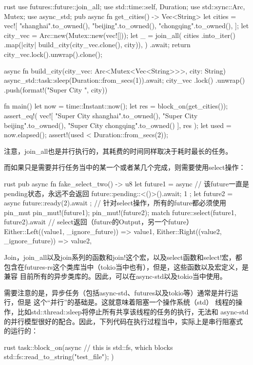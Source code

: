 \begin{code-block}{rust}
use futures::future::join_all;
use std::time::{self, Duration};
use std::sync::{Arc, Mutex};
use async_std;
pub async fn get_cities() -> Vec<String> {
    let cities = vec![
        "shanghai".to_owned(),
        "beijing".to_owned(),
        "chongqing".to_owned(),
    ];
    let city_vec = Arc::new(Mutex::new(vec![]));
    let _ = join_all(
        cities
            .into_iter()
            .map(|city| build_city(city_vec.clone(), city)),
    )
    .await;
    return city_vec.lock().unwrap().clone();
}

async fn build_city(city_vec: Arc<Mutex<Vec<String>>>, city: String) {
    async_std::task::sleep(Duration::from_secs(1)).await;
    city_vec
        .lock()
        .unwrap()
        .push(format!("Super City {}", city))
}

fn main() {
    let now = time::Instant::now();
    let res = block_on(get_cities());
    assert_eq!(
        vec![
            "Super City shanghai".to_owned(),
            "Super City beijing".to_owned(),
            "Super City chongqing".to_owned()
        ],
        res
    );
    let used = now.elapsed();
    assert!(used < Duration::from_secs(2));
}
\end{code-block}
注意，join\_all也是并行执行的，其耗费的时间同样取决于耗时最长的任务。

而如果只是需要并行任务当中的某一个或者某几个完成，则需要使用select操作：
\begin{code-block}{rust}
pub async fn fake_select_two() -> u8 {
    let future1 = async {
        // 该future一直是pending状态，永远不会返回
        future::pending::<()>().await;
        1
    };
    let future2 = async { future::ready(2).await };
    // 针对select操作，所有的future都必须使用pin_mut
    pin_mut!(future1);
    pin_mut!(future2);
    match future::select(future1, future2).await {
        // select返回（future的Output，另一个future）
        Either::Left((value1, _ignore_future)) => value1,
        Either::Right((value2, _ignore_future)) => value2,
    }
}
\end{code-block}

\begin{note}
Join，join\_all以及join系列的函数和join!这个宏，以及select函数和select!宏，都
包含在futures-rs这个类库当中（tokio当中也有），但是，这些函数以及宏定义，是兼容
目前所有的异步类库的。因此，可以在async-std以及tokio当中使用。
\end{note}

需要注意的是，异步任务（包括async-std、futures以及tokio等）通常是并行运行，但是
这个“并行”的基础是。这就意味着阻塞一个操作系统（std）
线程的操作，比如std::thread::sleep将停止所有共享该线程的任务的执行，无法和
async-std的并行模型很好的配合。因此，下列代码在执行过程当中，实际上是串行阻塞式
的运行的：
\begin{code-block}{rust}
task::block_on(async {
    // this is std::fs, which blocks
    std::fs::read_to_string("test_file");
})
\end{code-block}

